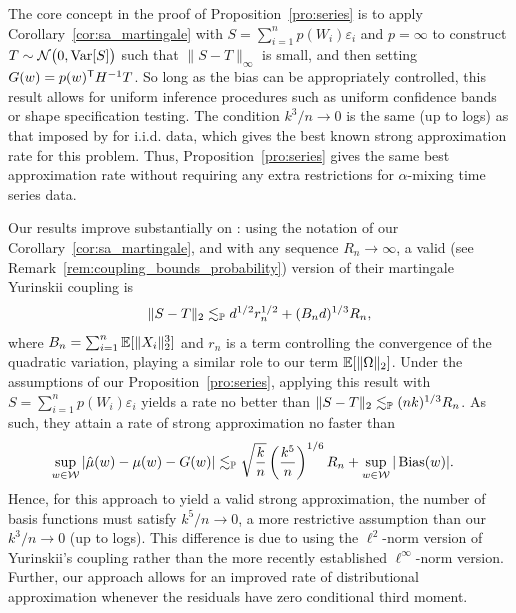 The core concept in the proof of Proposition~\ref{pro:series} is to apply
Corollary~\ref{cor:sa_martingale} with $S = \sum_{i=1}^n p(W_i) \varepsilon_i$
and $p=\infty$ to construct $T \sim \cN\big(0, \Var[S]\big)$ such that
$\|S - T \|_\infty$ is small, and then setting $G(w) = p(w)^\T H^{-1} T$. So
long as the bias can be appropriately controlled, this result allows for
uniform inference procedures such as uniform confidence bands or shape
specification testing. The condition $k^3 / n \to 0$ is the same (up to logs)
as that imposed by \citet{cattaneo2020large} for i.i.d. data, which gives the
best known strong approximation rate for this problem. Thus,
Proposition~\ref{pro:series} gives the same best approximation rate without
requiring any extra restrictions for $\alpha$-mixing time series data.

Our results improve substantially on \citet[Theorem~1]{li2020uniform}: using
the notation of our Corollary~\ref{cor:sa_martingale}, and with any sequence
$R_n \to \infty$, a valid (see Remark~\ref{rem:coupling_bounds_probability})
version of their martingale Yurinskii coupling is
%
\begin{align*}
  \|S-T\|_2
  \lesssim_\P
  d^{1/2} r^{1/2}_n
  + (B_n d)^{1/3} R_n,
\end{align*}
%
where $B_n = \sum_{i=1}^n \E[\|X_i\|_2^3]$ and $r_n$ is a term controlling the
convergence of the quadratic variation, playing a similar role to our
term $\E[\|\Omega\|_2]$. Under the assumptions of our
Proposition~\ref{pro:series}, applying this
result with $S = \sum_{i=1}^n p(W_i) \varepsilon_i$ yields a rate no better
than $\|S-T\|_2 \lesssim_\P (n k)^{1/3} R_n$. As such, they attain a rate of
strong approximation no faster than
%
\begin{align*}
  \sup_{w \in \cW}
  \left| \hat\mu(w) - \mu(w) - G(w) \right|
  &\lesssim_\P
  \sqrt{\frac{k}{n}}
  \left( \frac{k^5}{n} \right)^{1/6} R_n
  + \sup_{w \in \cW} |\Bias(w)|.
\end{align*}
%
Hence, for this approach to yield a valid strong approximation, the number of
basis functions must satisfy $k^5/n \to 0$, a more restrictive assumption than
our $k^3 / n \to 0$ (up to logs). This difference is due to
\citet{li2020uniform} using the $\ell^2$-norm version of Yurinskii's coupling
rather than the more recently established $\ell^\infty$-norm version. Further,
our approach allows for an improved rate of distributional approximation
whenever the residuals have zero conditional third moment.

